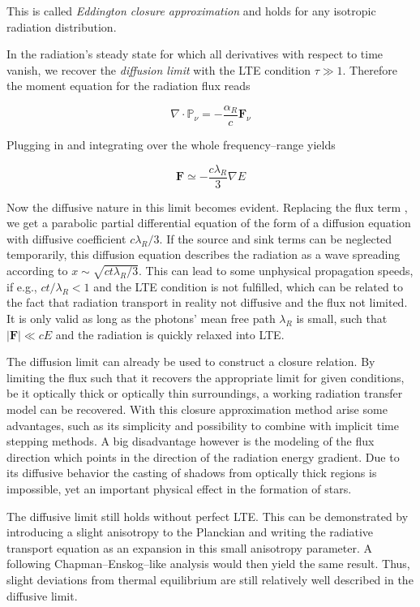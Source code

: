 This is called \textit{Eddington closure approximation} and holds for any isotropic radiation distribution.

In the radiation's steady state for which all derivatives with respect to time vanish, we recover the \textit{diffusion limit} with the LTE condition $\tau \gg 1$.
Therefore the moment equation for the radiation flux reads

\begin{equation}
  \nabla\cdot\mathbb{P}_{\nu} = -\frac{\alpha_{R}}{c}\textbf{F}_{\nu}
\end{equation}

Plugging in  and integrating over the whole frequency--range yields

\begin{equation}
  \textbf{F} \simeq -\frac{c\lambda_{R}}{3} \nabla E
\end{equation}

Now the diffusive nature in this limit becomes evident.
Replacing the flux term , we get a parabolic partial differential equation of the form of a diffusion equation with diffusive coefficient $c\lambda_{R}/3$.
If the source and sink terms can be neglected temporarily, this diffusion equation describes the radiation as a wave spreading according to $x \sim \sqrt{ct\lambda_{R}/3}$.
This can lead to some unphysical propagation speeds, if e.g., $ct/\lambda_{R} < 1$ and the LTE condition is not fulfilled, which can be related to the fact that radiation transport in reality not diffusive and the flux not limited.
It is only valid as long as the photons' mean free path $\lambda_{R}$ is small, such that $\vert\textbf{F}\vert \ll cE$ and the radiation is quickly relaxed into LTE.

The diffusion limit can already be used to construct a closure relation.
By limiting the flux such that it recovers the appropriate limit for given conditions, be it optically thick or optically thin surroundings, a working radiation transfer model can be recovered.
With this closure approximation method arise some advantages, such as its simplicity and possibility to combine with implicit time stepping methods.
A big disadvantage however is the modeling of the flux direction which points in the direction of the radiation energy gradient.
Due to its diffusive behavior the casting of shadows from optically thick regions is impossible, yet an important physical effect in the formation of stars.

The diffusive limit still holds without perfect LTE.
This can be demonstrated by introducing a slight anisotropy to the Planckian and writing the radiative transport equation as an expansion in this small anisotropy parameter.
A following Chapman--Enskog--like analysis would then yield the same result.
Thus, slight deviations from thermal equilibrium are still relatively well described in the diffusive limit.

